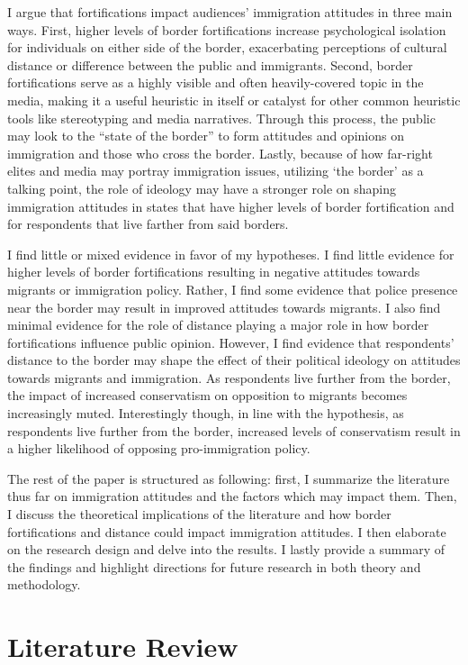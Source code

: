 \documentclass[12pt,]{article}
\begin{document}
I argue that fortifications impact audiences' immigration attitudes in
three main ways. First, higher levels of border fortifications increase
psychological isolation for individuals on either side of the border,
exacerbating perceptions of cultural distance or difference between the
public and immigrants. Second, border fortifications serve as a highly
visible and often heavily-covered topic in the media, making it a useful
heuristic in itself or catalyst for other common heuristic tools like
stereotyping and media narratives. Through this process, the public may
look to the ``state of the border'' to form attitudes and opinions on
immigration and those who cross the border. Lastly, because of how
far-right elites and media may portray immigration issues, utilizing
`the border' as a talking point, the role of ideology may have a
stronger role on shaping immigration attitudes in states that have
higher levels of border fortification and for respondents that live
farther from said borders.

I find little or mixed evidence in favor of my hypotheses. I find little
evidence for higher levels of border fortifications resulting in
negative attitudes towards migrants or immigration policy. Rather, I
find some evidence that police presence near the border may result in
improved attitudes towards migrants. I also find minimal evidence for
the role of distance playing a major role in how border fortifications
influence public opinion. However, I find evidence that respondents'
distance to the border may shape the effect of their political ideology
on attitudes towards migrants and immigration. As respondents live
further from the border, the impact of increased conservatism on
opposition to migrants becomes increasingly muted. Interestingly though,
in line with the hypothesis, as respondents live further from the
border, increased levels of conservatism result in a higher likelihood
of opposing pro-immigration policy.

The rest of the paper is structured as following: first, I summarize the
literature thus far on immigration attitudes and the factors which may
impact them. Then, I discuss the theoretical implications of the
literature and how border fortifications and distance could impact
immigration attitudes. I then elaborate on the research design and delve
into the results. I lastly provide a summary of the findings and
highlight directions for future research in both theory and methodology.

\section{Literature Review}\label{literature-review}
\end{document}
